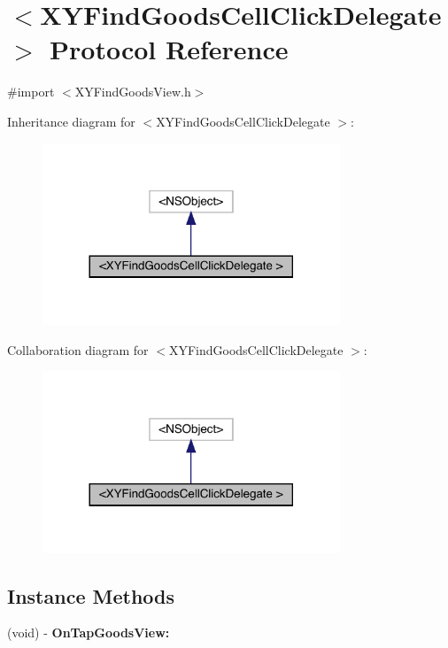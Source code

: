 \hypertarget{protocol_x_y_find_goods_cell_click_delegate_01-p}{}\section{$<$X\+Y\+Find\+Goods\+Cell\+Click\+Delegate $>$ Protocol Reference}
\label{protocol_x_y_find_goods_cell_click_delegate_01-p}


{\ttfamily \#import $<$X\+Y\+Find\+Goods\+View.\+h$>$}



Inheritance diagram for $<$X\+Y\+Find\+Goods\+Cell\+Click\+Delegate $>$\+:\nopagebreak
\begin{figure}[H]
\begin{center}
\leavevmode
\includegraphics[width=252pt]{protocol_x_y_find_goods_cell_click_delegate_01-p__inherit__graph}
\end{center}
\end{figure}


Collaboration diagram for $<$X\+Y\+Find\+Goods\+Cell\+Click\+Delegate $>$\+:\nopagebreak
\begin{figure}[H]
\begin{center}
\leavevmode
\includegraphics[width=252pt]{protocol_x_y_find_goods_cell_click_delegate_01-p__coll__graph}
\end{center}
\end{figure}
\subsection*{Instance Methods}
\begin{DoxyCompactItemize}
\item 
\mbox{\label{protocol_x_y_find_goods_cell_click_delegate_01-p_a606eb1aa6e0f0e75066bef2262ec6bd6}} 
(void) -\/ {\bfseries On\+Tap\+Goods\+View\+:}
\end{DoxyCompactItemize}


